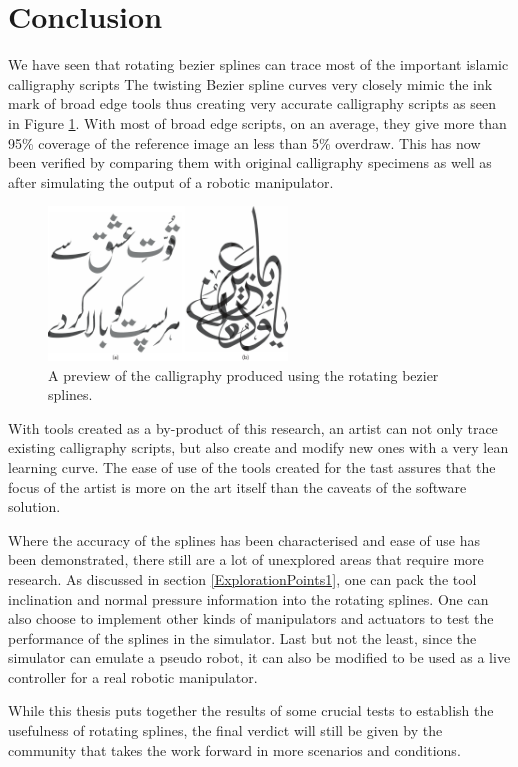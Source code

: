 \section{Conclusion}
\label{Chapter:Conclusion}
{
    We have seen that rotating bezier splines can trace most of the important islamic calligraphy scripts 
    The twisting Bezier spline curves very closely mimic the ink mark of broad edge tools thus creating very accurate calligraphy scripts as seen in Figure \ref{Image:spline_prev}. With most of broad edge scripts, on an average, they give more than 95\% coverage of the reference image an less than 5\% overdraw. This has now been verified by comparing them with original calligraphy specimens as well as after simulating the output of a robotic manipulator.

    \begin{figure}[!t]
        \centering
        \includegraphics[width=2.5in]{../Images/rotating bezier splines preview.pdf}
      \caption{A preview of the calligraphy produced using the rotating bezier splines.
      } \label{Image:spline_prev}
    \end{figure}

    With tools created as a by-product of this research, an artist can not only trace existing calligraphy scripts, but also create and modify new ones with a very lean learning curve. The ease of use of the tools created for the tast assures that the focus of the artist is more on the art itself than the caveats of the software solution.

    Where the accuracy of the splines has been characterised and ease of use has been demonstrated, there still are a lot of unexplored areas that require more research. As discussed in section \ref{ExplorationPoints1}, one can pack the tool inclination and normal pressure information into the rotating splines. One can also choose to implement other kinds of manipulators and actuators to test the performance of the splines in the simulator. Last but not the least, since the simulator can emulate a pseudo robot, it can also be modified to be used as a live controller for a real robotic manipulator.

    While this thesis puts together the results of some crucial tests to establish the usefulness of rotating splines, the final verdict will still be given by the community that takes the work forward in more scenarios and conditions.
} 
